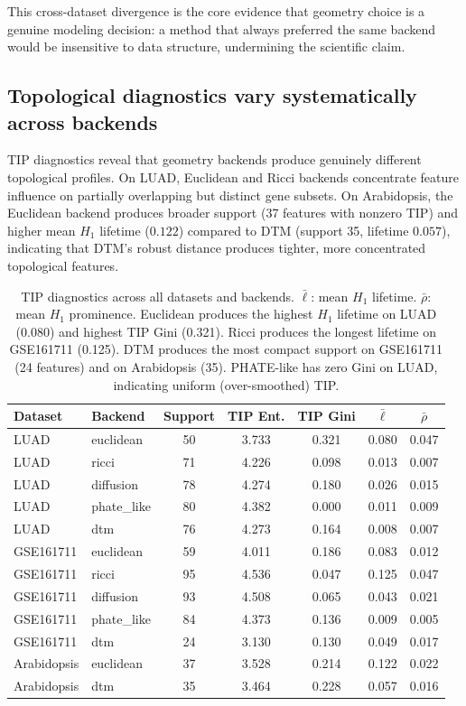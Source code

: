 \documentclass[11pt]{article}
\begin{document}
This cross-dataset divergence is the core evidence that geometry choice is a genuine modeling decision: a method that always preferred the same backend would be insensitive to data structure, undermining the scientific claim.

\subsection{Topological diagnostics vary systematically across backends}

TIP diagnostics reveal that geometry backends produce genuinely different topological profiles.
On LUAD, Euclidean and Ricci backends concentrate feature influence on partially overlapping but distinct gene subsets.
On Arabidopsis, the Euclidean backend produces broader support (37 features with nonzero TIP) and higher mean $H_1$ lifetime ($0.122$) compared to DTM (support 35, lifetime $0.057$), indicating that DTM's robust distance produces tighter, more concentrated topological features.

\begin{table}[h]
\centering
\small
\begin{tabular}{llccccc}
\toprule
\textbf{Dataset} & \textbf{Backend} & \textbf{Support} & \textbf{TIP Ent.} & \textbf{TIP Gini} & \textbf{$\bar{\ell}$} & \textbf{$\bar{\rho}$} \\
\midrule
LUAD & euclidean & 50 & 3.733 & 0.321 & 0.080 & 0.047 \\
LUAD & ricci & 71 & 4.226 & 0.098 & 0.013 & 0.007 \\
LUAD & diffusion & 78 & 4.274 & 0.180 & 0.026 & 0.015 \\
LUAD & phate\_like & 80 & 4.382 & 0.000 & 0.011 & 0.009 \\
LUAD & dtm & 76 & 4.273 & 0.164 & 0.008 & 0.007 \\
\midrule
GSE161711 & euclidean & 59 & 4.011 & 0.186 & 0.083 & 0.012 \\
GSE161711 & ricci & 95 & 4.536 & 0.047 & 0.125 & 0.047 \\
GSE161711 & diffusion & 93 & 4.508 & 0.065 & 0.043 & 0.021 \\
GSE161711 & phate\_like & 84 & 4.373 & 0.136 & 0.009 & 0.005 \\
GSE161711 & dtm & 24 & 3.130 & 0.130 & 0.049 & 0.017 \\
\midrule
Arabidopsis & euclidean & 37 & 3.528 & 0.214 & 0.122 & 0.022 \\
Arabidopsis & dtm & 35 & 3.464 & 0.228 & 0.057 & 0.016 \\
\bottomrule
\end{tabular}
\caption{TIP diagnostics across all datasets and backends.
$\bar{\ell}$: mean $H_1$ lifetime. $\bar{\rho}$: mean $H_1$ prominence.
Euclidean produces the highest $H_1$ lifetime on LUAD (0.080) and highest TIP Gini (0.321).
Ricci produces the longest lifetime on GSE161711 (0.125).
DTM produces the most compact support on GSE161711 (24 features) and on Arabidopsis (35).
PHATE-like has zero Gini on LUAD, indicating uniform (over-smoothed) TIP.}
\label{tab:diagnostics}
\end{table}
\end{document}
